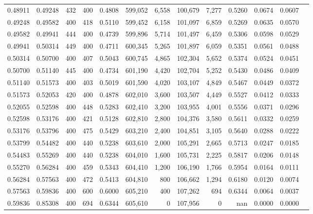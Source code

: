 \begin{tabular}{rrrrrrrrrrrrr}
0.48911 & 0.49248 &    432 & 400 &                                     0.4808 & 599,052 &   6,558 & 100,679 &   7,277 & 0.5260 & 0.0674 & 0.0607 \\
0.49248 & 0.49582 &    400 & 418 &                                     0.5110 & 599,452 &   6,158 & 101,097 &   6,859 & 0.5269 & 0.0635 & 0.0570 \\
0.49582 & 0.49941 &    444 & 400 &                                     0.4739 & 599,896 &   5,714 & 101,497 &   6,459 & 0.5306 & 0.0598 & 0.0529 \\
0.49941 & 0.50314 &    449 & 400 &                                     0.4711 & 600,345 &   5,265 & 101,897 &   6,059 & 0.5351 & 0.0561 & 0.0488 \\
0.50314 & 0.50700 &    400 & 407 &                                     0.5043 & 600,745 &   4,865 & 102,304 &   5,652 & 0.5374 & 0.0524 & 0.0451 \\
0.50700 & 0.51140 &    445 & 400 &                                     0.4734 & 601,190 &   4,420 & 102,704 &   5,252 & 0.5430 & 0.0486 & 0.0409 \\
0.51140 & 0.51573 &    400 & 403 &                                     0.5019 & 601,590 &   4,020 & 103,107 &   4,849 & 0.5467 & 0.0449 & 0.0372 \\
0.51573 & 0.52053 &    420 & 400 &                                     0.4878 & 602,010 &   3,600 & 103,507 &   4,449 & 0.5527 & 0.0412 & 0.0333 \\
0.52055 & 0.52598 &    400 & 448 &                                     0.5283 & 602,410 &   3,200 & 103,955 &   4,001 & 0.5556 & 0.0371 & 0.0296 \\
0.52598 & 0.53176 &    400 & 421 &                                     0.5128 & 602,810 &   2,800 & 104,376 &   3,580 & 0.5611 & 0.0332 & 0.0259 \\
0.53176 & 0.53796 &    400 & 475 &                                     0.5429 & 603,210 &   2,400 & 104,851 &   3,105 & 0.5640 & 0.0288 & 0.0222 \\
0.53799 & 0.54482 &    400 & 440 &                                     0.5238 & 603,610 &   2,000 & 105,291 &   2,665 & 0.5713 & 0.0247 & 0.0185 \\
0.54483 & 0.55269 &    400 & 440 &                                     0.5238 & 604,010 &   1,600 & 105,731 &   2,225 & 0.5817 & 0.0206 & 0.0148 \\
0.55270 & 0.56284 &    400 & 459 &                                     0.5343 & 604,410 &   1,200 & 106,190 &   1,766 & 0.5954 & 0.0164 & 0.0111 \\
0.56284 & 0.57563 &    400 & 472 &                                     0.5413 & 604,810 &     800 & 106,662 &   1,294 & 0.6180 & 0.0120 & 0.0074 \\
0.57563 & 0.59836 &    400 & 600 &                                     0.6000 & 605,210 &     400 & 107,262 &     694 & 0.6344 & 0.0064 & 0.0037 \\
0.59836 & 0.85308 &    400 & 694 &                                     0.6344 & 605,610 &       0 & 107,956 &       0 &    nan & 0.0000 & 0.0000 \\
\bottomrule
\end{tabular}
